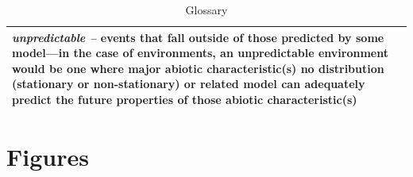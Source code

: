 \documentclass[11pt,letterpaper]{article}
\begin{document}
\begin{center}
\begin{table}
\begin{tabular}{ | p{16 cm} | }
\emph{unpredictable --}  events that fall outside of those predicted by some model---in the case of environments, an unpredictable environment would be one where major abiotic characteristic(s) no distribution (stationary or non-stationary) or related model can adequately predict the future properties of those abiotic characteristic(s)   \\  
\hline \hline
\end{tabular}
\caption{Glossary}
 \label{tab:gloss}
\end{table}
\end{center}

\clearpage

\section{Figures}
\end{document}
